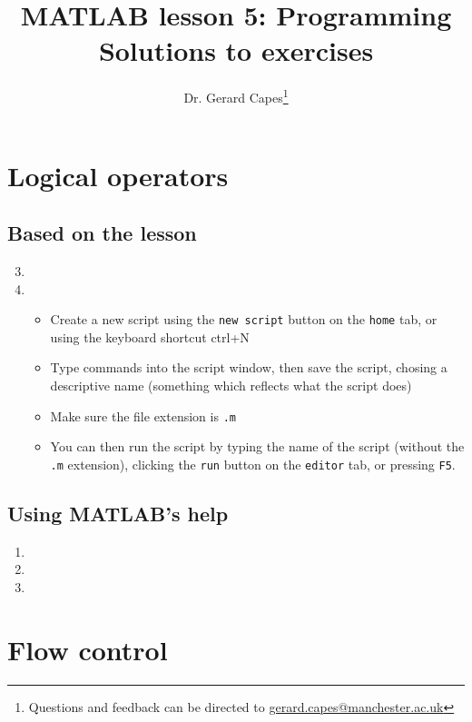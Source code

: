 \documentclass{article}
\title{MATLAB lesson 5: Programming\\Solutions to exercises}
\date{}
\author{Dr. Gerard Capes\thanks{Questions and feedback can be directed to \href{mailto:gerard.capes@manchester.ac.uk?subject=Feedback on MATLAB lesson 5 (programming) solutions sheet}{gerard.capes@manchester.ac.uk}}}
\begin{document}
	\maketitle
	
	\section{Logical operators}
	\subsection*{Based on the lesson}
		\begin{enumerate}
			\setcounter{enumi}{2}
			\item 
			\item 
			\begin{itemize}
				\item Create a new script using the \texttt{new script} button on the \texttt{home} tab, or using the keyboard shortcut ctrl+N
				\item Type commands into the script window, then save the script, chosing a descriptive name (something which reflects what the script does)
				\item Make sure the file extension is \texttt{.m}
				\item You can then run the script by typing the name of the script (without the \texttt{.m} extension), clicking the \texttt{run} button on the \texttt{editor} tab, or pressing \texttt{F5}.
			\end{itemize}
		\end{enumerate}
	\subsection*{Using MATLAB's help}
	\begin{enumerate}[resume]
		\item 
		
		\item 
		
		\item 
	\end{enumerate}
	
	\section{Flow control}
\end{document}
